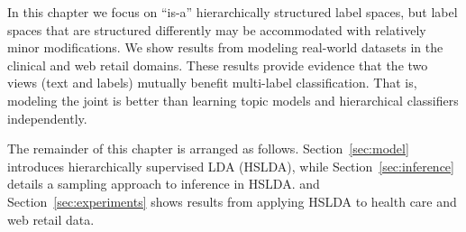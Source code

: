 
In this chapter we focus on ``is-a'' hierarchically structured label spaces, but label spaces that are structured differently may be accommodated with relatively minor modifications. 
%
%
We show results from modeling real-world datasets in the clinical and web
retail domains. These results provide evidence that the two views (text and labels) mutually benefit  multi-label
classification.%
That is, modeling the joint  is better than learning 
topic models and hierarchical classifiers
independently. 

The remainder of this chapter is arranged as follows. Section~\ref{sec:model}
introduces hierarchically supervised LDA (HSLDA), while
Section~\ref{sec:inference} details a sampling approach to inference in HSLDA. 
and
Section~\ref{sec:experiments} shows results from applying HSLDA to health care
and web retail data.  


